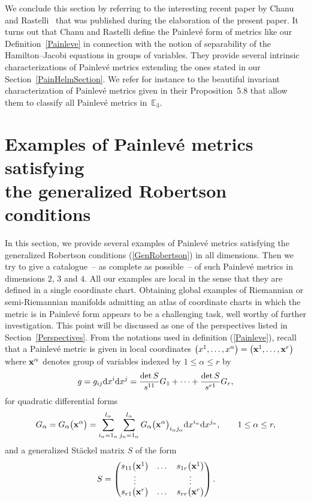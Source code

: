 \documentclass[pdftex]{sigma}
\numberwithin{equation}{section}
\begin{document}
We conclude this section by referring to the interesting recent paper by Chanu and Rastelli~\cite{CR2019} that was published during the elaboration of the present paper. It turns out that Chanu and Rastelli define the Painlev\'e form of metrics like our Definition~\ref{Painleve} in connection with the notion of separability of the Hamilton--Jacobi equations in groups of variables. They provide several intrinsic characterizations of Painlev\'e metrics extending the ones stated in our Section~\ref{PainHelmSection}. We refer for instance to the beautiful invariant characterization of Painlev\'e metrics given in their Proposition~5.8 that allow them to classify all Painlev\'e metrics in~$\mathbb{E}_3$.

\section[Examples of Painlev\'e metrics satisfying the generalized Robertson conditions]{Examples of Painlev\'e metrics satisfying\\ the generalized Robertson conditions} \label{2}

In this section, we provide several examples of Painlev\'e metrics satisfying the generalized Robertson conditions (\ref{GenRobertson}) in all dimensions. Then we try to give a catalogue~-- as complete as possible~-- of such Painlev\'e metrics in dimensions $2$, $3$ and $4$. All our examples are local in the sense that they are defined in a single coordinate chart. Obtaining global examples of Riemannian or semi-Riemannian manifolds admitting an atlas of coordinate charts in which the metric is in Painlev\'e form appears to be a challenging task, well worthy of further investigation. This point will be discussed as one of the perspectives listed in Section~\ref{Perspectives}. From the notations used in definition (\ref{Painleve}), recall that a Painlev\'e metric is given in local coordinates $\big(x^1,\dots,x^n\big) = \big({\bf x}^{1},\dots,{\bf x}^{r}\big)$ where ${\bf x}^{\alpha}$ denotes group of variables indexed by $1\leq \alpha\leq r$ by
\begin{gather*} %
g = g_{ij}{\rm d}x^{i}{\rm d}x^{j}=\frac{\det S}{s^{11}} G_1 +\cdots+\frac{\det S}{s^{r1}} G_r,
\end{gather*}
for quadratic differential forms
\begin{gather} \label{Ga}
G_{\alpha}=G_{\alpha}\big({{\bf x}^{\alpha}}\big)=\sum_{i_{\alpha}=1_{\alpha}}^{l_{\alpha}}\sum_{j_{\alpha}=1_{\alpha}}^{l_{\alpha}}G_{\alpha}\big({{\bf x}^{\alpha}}\big)_{i_{\alpha}j_{\alpha}}{\rm d}x^{i_{\alpha}}{\rm d}x^{j_{\alpha}},\qquad 1\leq \alpha \leq r,
\end{gather}
and a generalized St\"ackel matrix $S$ of the form
\[
S=\left(
\begin{matrix}
s_{11}\big({{\bf x}^{1}}\big)&\dots&s_{1r}\big({{\bf x}^{1}}\big) \\
\vdots& & \vdots \\
s_{r1}\big({{\bf x}^{r}}\big)&\dots&s_{rr}\big({\bf x}^{r}\big)
\end{matrix}
\right).
\]
\end{document}
